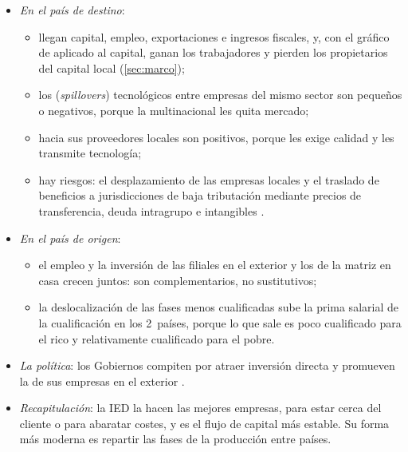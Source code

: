 \documentclass[11pt]{article}
\begin{document}
\begin{itemize}
\item \emph{En el país de destino}:
  \begin{itemize}
  \item llegan capital, empleo, exportaciones e ingresos fiscales, y, con el gráfico de  aplicado al capital, ganan los trabajadores y pierden los propietarios del capital local (\ref{sec:marco});
  \item los  (\emph{spillovers}) tecnológicos entre empresas del mismo sector son pequeños o negativos, porque la multinacional les quita mercado\nocite{AitkenHarrison1999};
  \item hacia sus proveedores locales son positivos, porque les exige calidad y les transmite tecnología\nocite{Javorcik2004};
  \item hay riesgos: el desplazamiento de las empresas locales y el traslado de beneficios a jurisdicciones de baja tributación mediante precios de transferencia, deuda intragrupo e intangibles .
  \end{itemize}
\item \emph{En el país de origen}:
  \begin{itemize}
  \item el empleo y la inversión de las filiales en el exterior y los de la matriz en casa crecen juntos: son complementarios, no sustitutivos\nocite{DesaiFoleyHines2009};
  \item la deslocalización de las fases menos cualificadas sube la prima salarial de la cualificación en los 2~países, porque lo que sale es poco cualificado para el rico y relativamente cualificado para el pobre\nocite{FeenstraHanson1997}.
  \end{itemize}
\item \emph{La política}: los Gobiernos compiten por atraer inversión directa y promueven la de sus empresas en el exterior .
\item \emph{Recapitulación}: la IED la hacen las mejores empresas, para estar cerca del cliente o para abaratar costes, y es el flujo de capital más estable. Su forma más moderna es repartir las fases de la producción entre países.
\end{itemize}
\end{document}
